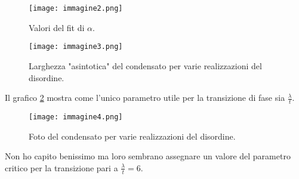 \documentclass[10pt,a4paper]{article}
\begin{document}
\begin{figure}[!htb]
\centering
\texttt{[image: immagine2.png]}
\caption{Valori del fit di $\alpha$.\label{alpha}}
\end{figure}

\begin{figure}[!htb]
\centering
\texttt{[image: immagine3.png]}
\caption{Larghezza "asintotica" del condensato per varie realizzazioni del disordine.\label{univ}}
\end{figure}

Il grafico \ref{univ} mostra come l'unico parametro utile per la transizione di fase sia $\frac{\lambda}{t}$.

\begin{figure}[!htb]
\centering
\texttt{[image: immagine4.png]}
\caption{Foto del condensato per varie realizzazioni del disordine.\label{foto}}
\end{figure}

Non ho capito benissimo ma loro sembrano assegnare un valore del parametro critico per la transizione pari a $\frac{\lambda}{t} = 6$.
\end{document}
